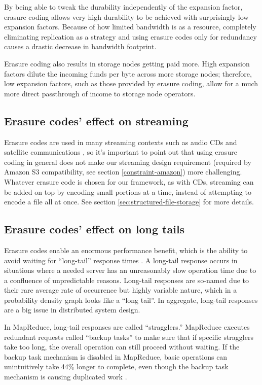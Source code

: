 \documentclass[8pt,fleqn,openany]{book}
\begin{document}
By being able to tweak the durability independently of the expansion factor,
erasure coding allows very high durability to be achieved with surprisingly
low expansion factors.
Because of how limited bandwidth is as a resource, completely eliminating
replication as a
strategy and using erasure codes only for redundancy causes a drastic
decrease in bandwidth footprint.

Erasure coding also results in storage nodes getting paid more.
High expansion factors dilute the incoming funds per byte across more storage
nodes; therefore, low expansion factors, such as those provided by erasure
coding, allow for a much more direct passthrough of income to storage node
operators.

\subsection{Erasure codes' effect on streaming}

Erasure codes are used in many streaming contexts such as audio CDs and
satellite communications \cite{rs-cd},
so it's important to point out that using erasure coding in general does not
make our streaming design requirement (required by Amazon S3 compatibility,
see section \ref{constraint-amazon}) more challenging.
Whatever erasure code is chosen for our framework, as with CDs, streaming can
be added on top by encoding small portions at a time, instead of attempting to
encode a file all at once. See section \ref{sec:structured-file-storage} for
more details.

\subsection{Erasure codes' effect on long tails}\label{sec:long-tail}

Erasure codes enable an enormous performance benefit, which is the ability to
avoid waiting for ``long-tail'' response times \cite{tail-at-scale}. A
long-tail response occurs in situations where a needed server has an
unreasonably slow operation time due to a confluence of unpredictable reasons.
Long-tail responses are so-named due to their rare average rate of occurrence
but highly variable nature, which in a probability density graph looks like a
``long tail''.
In aggregate, long-tail responses are a big issue in distributed system design.

In MapReduce, long-tail responses are called ``stragglers.''
MapReduce executes redundant requests called ``backup tasks'' to make
sure that if specific stragglers take too long, the overall operation can still
proceed without waiting. If the backup task mechanism is disabled in MapReduce,
basic operations can unintuitively take 44\% longer to complete, even though
the backup task mechanism is causing duplicated work \cite{mapreduce}.
\end{document}
